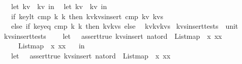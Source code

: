 \begin{isabellebody}
\ \ let\ {\isacharparenleft}k{\isacharcomma}v{\isacharparenright}\ {\isacharequal}\ kv\ in\isanewline
\ \ let\ {\isacharparenleft}k{\isacharprime}{\isacharcomma}v{\isacharprime}{\isacharparenright}\ {\isacharequal}\ kv{\isacharprime}\ in\isanewline
\ \ if\ key{\isacharunderscore}lt\ cmp\ k{\isacharprime}\ k\ then\ {\isacharparenleft}k{\isacharprime}{\isacharcomma}v{\isacharprime}{\isacharparenright}{\isacharhash}{\isacharparenleft}kvs{\isacharunderscore}insert\ cmp\ kv\ kvs{\isacharprime}{\isacharparenright}\isanewline
\ \ else\ if\ {\isacharparenleft}key{\isacharunderscore}eq\ cmp\ k\ k{\isacharprime}{\isacharparenright}\ then\ {\isacharparenleft}k{\isacharcomma}v{\isacharparenright}{\isacharhash}kvs{\isacharprime}\ else\isanewline
\ \ {\isacharparenleft}k{\isacharcomma}v{\isacharparenright}{\isacharhash}{\isacharparenleft}k{\isacharprime}{\isacharcomma}v{\isacharprime}{\isacharparenright}{\isacharhash}kvs{\isacharprime}\isanewline
{\isacharparenright}{\isachardoublequoteclose}\isanewline
\isanewline
{}\isamarkupfalse%
\ kvs{\isacharunderscore}insert{\isacharunderscore}tests\ {\isacharcolon}{\isacharcolon}\ unit\ \isanewline
{\isachardoublequoteopen}kvs{\isacharunderscore}insert{\isacharunderscore}tests\ {\isacharequal}\ {\isacharparenleft}\isanewline
\ \ let\ {\isacharunderscore}\ {\isacharequal}\ assert{\isacharunderscore}true\ {\isacharparenleft}kvs{\isacharunderscore}insert\ nat{\isacharunderscore}ord\ {\isacharparenleft}{}{\isacharcomma}{}{\isacharparenright}\ {\isacharparenleft}List{\isachardot}map\ {\isacharparenleft}{\isacharpercent}\ x{\isachardot}\ {\isacharparenleft}x{\isacharcomma}x{\isacharparenright}{\isacharparenright}\ {\isacharbrackleft}{}{\isacharcomma}{}{\isacharcomma}{}{\isacharcomma}{}{\isacharbrackright}{\isacharparenright}\ {\isacharequal}\ \isanewline
\ \ \ \ {\isacharparenleft}List{\isachardot}map\ {\isacharparenleft}{\isacharpercent}\ x{\isachardot}\ {\isacharparenleft}x{\isacharcomma}x{\isacharparenright}{\isacharparenright}\ {\isacharbrackleft}{}{\isacharcomma}{}{\isacharcomma}{}{\isacharcomma}{}{\isacharcomma}{}{\isacharbrackright}{\isacharparenright}{\isacharparenright}\isanewline
\ \ in\isanewline
\ \ let\ {\isacharunderscore}\ {\isacharequal}\ assert{\isacharunderscore}true\ {\isacharparenleft}kvs{\isacharunderscore}insert\ nat{\isacharunderscore}ord\ {\isacharparenleft}{}{\isacharcomma}{}{\isacharparenright}\ {\isacharparenleft}List{\isachardot}map\ {\isacharparenleft}{\isacharpercent}\ x{\isachardot}\ {\isacharparenleft}x{\isacharcomma}x{\isacharparenright}{\isacharparenright}\ {\isacharbrackleft}{}{\isacharcomma}{}{\isacharcomma}{}{\isacharcomma}{}{\isacharbrackright}{\isacharparenright}\ {\isacharequal}\ \isanewline

\end{isabellebody}
